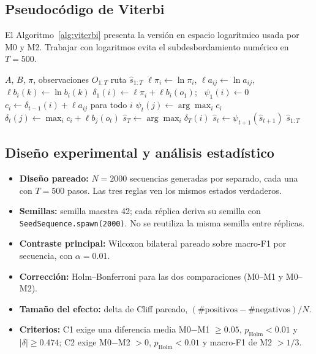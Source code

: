 \documentclass[11pt,letterpaper]{article}
\begin{document}
\subsection{Pseudocódigo de Viterbi}

El Algoritmo~\ref{alg:viterbi} presenta la versión en espacio logarítmico usada por M0 y M2. Trabajar con logaritmos evita el subdesbordamiento numérico en \(T=500\).

\begin{algorithm}[H]
\caption{Viterbi en espacio logarítmico}
\label{alg:viterbi}
\begin{algorithmic}[1]
\Require \(A\), \(B\), \(\pi\), observaciones \(O_{1:T}\)
\Ensure ruta \(\hat{s}_{1:T}\)
\State \(\ell\pi_i\gets\ln\pi_i\), \(\ell a_{ij}\gets\ln a_{ij}\), \(\ell b_i(k)\gets\ln b_i(k)\)
  \State \(\delta_1(i)\gets\ell\pi_i+\ell b_i(o_1)\); \ \(\psi_1(i)\gets 0\)
\EndFor
{}
    \State \(c_i\gets\delta_{t-1}(i)+\ell a_{ij}\) para todo \(i\)
    \State \(\psi_t(j)\gets\arg\max_i c_i\)
    \State \(\delta_t(j)\gets\max_i c_i+\ell b_j(o_t)\)
  \EndFor
\EndFor
\State \(\hat{s}_T\gets\arg\max_i\delta_T(i)\)
  \State \(\hat{s}_t\gets\psi_{t+1}(\hat{s}_{t+1})\)
\EndFor
\State \Return \(\hat{s}_{1:T}\)
\end{algorithmic}
\end{algorithm}

\subsection{Diseño experimental y análisis estadístico}

\begin{itemize}
  \item \textbf{Diseño pareado:} \(N=2000\) secuencias generadas por separado, cada una con \(T=500\) pasos. Las tres reglas ven los mismos estados verdaderos.
  \item \textbf{Semillas:} semilla maestra 42; cada réplica deriva su semilla con \texttt{SeedSequence.spawn(2000)}. No se reutiliza la misma semilla entre réplicas.
  \item \textbf{Contraste principal:} Wilcoxon bilateral pareado sobre macro-F1 por secuencia, con \(\alpha=0.01\).
  \item \textbf{Corrección:} Holm--Bonferroni para las dos comparaciones (M0--M1 y M0--M2).
  \item \textbf{Tamaño del efecto:} delta de Cliff pareado, \((\#\text{positivos}-\#\text{negativos})/N\).
  \item \textbf{Criterios:} C1 exige una diferencia media M0\(-\)M1 \(\ge 0.05\), \(p_{\text{Holm}}<0.01\) y \(|\delta|\ge0.474\); C2 exige M0\(-\)M2 \(>0\), \(p_{\text{Holm}}<0.01\) y macro-F1 de M2 \(>1/3\).
\end{itemize}
\end{document}
